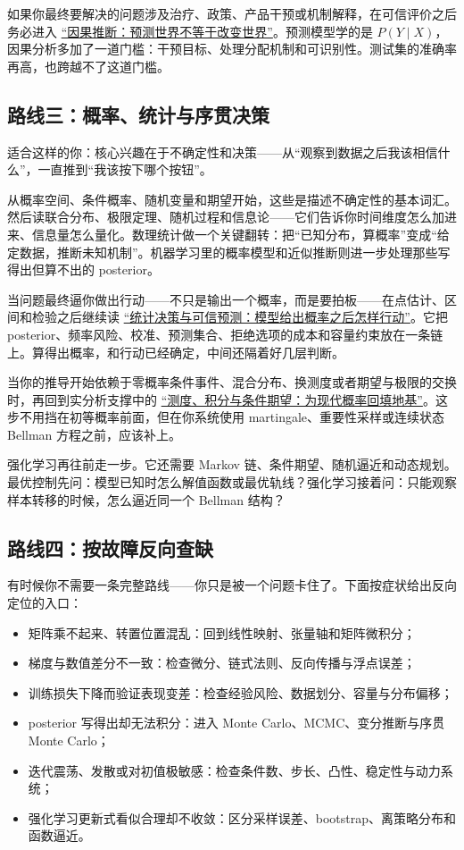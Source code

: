 如果你最终要解决的问题涉及治疗、政策、产品干预或机制解释，在可信评价之后务必进入 \hyperref[ch:120]{``因果推断：预测世界不等于改变世界''}。预测模型学的是 \(P(Y\mid X)\)，因果分析多加了一道门槛：干预目标、处理分配机制和可识别性。测试集的准确率再高，也跨越不了这道门槛。

\subsection{路线三：概率、统计与序贯决策}

适合这样的你：核心兴趣在于不确定性和决策——从``观察到数据之后我该相信什么''，一直推到``我该按下哪个按钮''。

从概率空间、条件概率、随机变量和期望开始，这些是描述不确定性的基本词汇。然后读联合分布、极限定理、随机过程和信息论——它们告诉你时间维度怎么加进来、信息量怎么量化。数理统计做一个关键翻转：把``已知分布，算概率''变成``给定数据，推断未知机制''。机器学习里的概率模型和近似推断则进一步处理那些写得出但算不出的 posterior。

当问题最终逼你做出行动——不只是输出一个概率，而是要拍板——在点估计、区间和检验之后继续读 \hyperref[ch:092]{``统计决策与可信预测：模型给出概率之后怎样行动''}。它把 posterior、频率风险、校准、预测集合、拒绝选项的成本和容量约束放在一条链上。算得出概率，和行动已经确定，中间还隔着好几层判断。

当你的推导开始依赖于零概率条件事件、混合分布、换测度或者期望与极限的交换时，再回到实分析支撑中的 \hyperref[ch:101]{``测度、积分与条件期望：为现代概率回填地基''}。这步不用挡在初等概率前面，但在你系统使用 martingale、重要性采样或连续状态 Bellman 方程之前，应该补上。

强化学习再往前走一步。它还需要 Markov 链、条件期望、随机逼近和动态规划。最优控制先问：模型已知时怎么解值函数或最优轨线？强化学习接着问：只能观察样本转移的时候，怎么逼近同一个 Bellman 结构？

\subsection{路线四：按故障反向查缺}

有时候你不需要一条完整路线——你只是被一个问题卡住了。下面按症状给出反向定位的入口：

\begin{itemize}
\tightlist
\item
  矩阵乘不起来、转置位置混乱：回到线性映射、张量轴和矩阵微积分；
\item
  梯度与数值差分不一致：检查微分、链式法则、反向传播与浮点误差；
\item
  训练损失下降而验证表现变差：检查经验风险、数据划分、容量与分布偏移；
\item
  posterior 写得出却无法积分：进入 Monte Carlo、MCMC、变分推断与序贯 Monte Carlo；
\item
  迭代震荡、发散或对初值极敏感：检查条件数、步长、凸性、稳定性与动力系统；
\item
  强化学习更新式看似合理却不收敛：区分采样误差、bootstrap、离策略分布和函数逼近。
\end{itemize}

